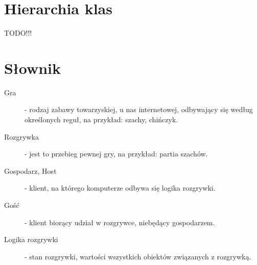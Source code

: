 \documentclass[a4paper, 12pt]{article}
\begin{document}
\section{Hierarchia klas}
TODO!!!

\section{Słownik}
\begin{description}
 \item[Gra] - rodzaj zabawy towarzyskiej, u nas internetowej, odbywający się według określonych reguł, na przykład: szachy, chińczyk.
 \item[Rozgrywka] - jest to przebieg pewnej gry, na przykład: partia szachów.
 \item[Gospodarz, Host] - klient, na którego komputerze odbywa się logika rozgrywki.
 \item[Gość] - klient biorący udział w rozgrywce, niebędący gospodarzem.
 \item[Logika rozgrywki] - stan rozgrywki, wartości wszystkich obiektów związanych z rozgrywką.
\end{description}
\end{document}
